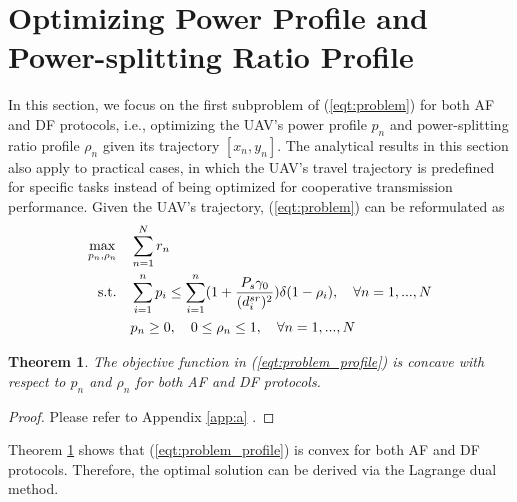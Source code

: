 \documentclass[12pt, draftclsnofoot, onecolumn]{IEEEtran}
\newtheorem{theorem}{Theorem}
\begin{document}
\section{Optimizing Power Profile and Power-splitting Ratio Profile}\label{sec:3}
In this section, we focus on the first subproblem of (\ref{eqt:problem}) for both AF and DF protocols, i.e., optimizing the UAV's power profile $p_{n}$ and power-splitting ratio profile  $\rho_{n}$ given its trajectory $[x_{n},y_{n}]$. The analytical results in this section also apply to practical cases, in which the UAV's travel trajectory is predefined for specific tasks instead of being optimized for cooperative transmission performance. Given the UAV's trajectory, (\ref{eqt:problem}) can be reformulated as 
\begin{equation}\label{eqt:problem_profile}
\begin{aligned}
\max\limits_{p_{n},\rho_{n}}\quad &\sum\limits _{n=1}^{N}r_{n}\\
{\rm s.t.}\quad &\sum\limits _{i=1}^{n}p_{i}\leq\sum\limits _{i=1}^{n}(1+\dfrac{P_{s}\gamma_{0}}{(d^{sr}_{i})^{2}})\delta(1-\rho_{i}),\quad \forall n=1,...,N\\
&p_{n}\geq 0,\quad 0\leq\rho_{n}\leq 1, \quad \forall n=1,...,N
\end{aligned}
\end{equation}

\begin{theorem}\label{theorem:concavity}
The objective function in (\ref{eqt:problem_profile}) is concave with respect to $p_{n}$ and $\rho_{n}$ for both AF and DF protocols.
\end{theorem}

\begin{proof}
Please refer to Appendix \ref{app:a} .
\end{proof}

Theorem \ref{theorem:concavity} shows that (\ref{eqt:problem_profile}) is convex for both AF and DF protocols. Therefore, the optimal solution can be derived via the Lagrange dual method.
\end{document}
